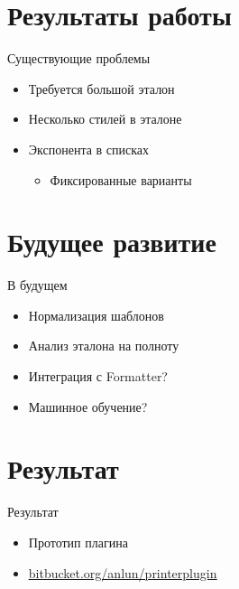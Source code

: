 \documentclass[sans]{beamer}
\begin{document}
\section{Результаты работы}

\begin{frame}{Существующие проблемы}
	\begin{itemize}
		\item Требуется большой эталон 
		\item Несколько стилей в эталоне
		\item Экспонента в списках
		\begin{itemize}
			\item Фиксированные варианты
		\end{itemize}
	\end{itemize}
\end{frame}

\section{Будущее развитие}

\begin{frame}{В будущем}
	\begin{itemize}
		\item Нормализация шаблонов
		\item Анализ эталона на полноту
		\item Интеграция с Formatter?
		\item Машинное обучение?
	\end{itemize}
\end{frame}

\section{Результат}

\begin{frame}{Результат}
	\begin{itemize}
		\item Прототип плагина
		\item \color{blue} \underline{\url{bitbucket.org/anlun/printerplugin}}
	\end{itemize}
\end{frame}
\end{document}
